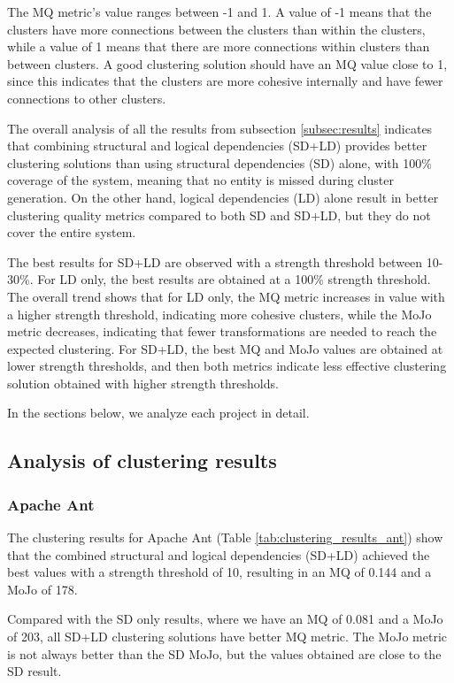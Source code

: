 \documentclass{ieeeaccess}
\begin{document}
The MQ metric's value ranges between -1 and 1. A value of -1 means that the clusters have more connections between the clusters than within the clusters, while a value of 1 means that there are more connections within clusters than between clusters. A good clustering solution should have an MQ value close to 1, since this indicates that the clusters are more cohesive internally and have fewer connections to other clusters.

The overall analysis of all the results from subsection \ref{subsec:results} indicates that combining structural and logical dependencies (SD+LD) provides better clustering solutions than using structural dependencies (SD) alone, with 100\% coverage of the system, meaning that no entity is missed during cluster generation. On the other hand, logical dependencies (LD) alone result in better clustering quality metrics compared to both SD and SD+LD, but they do not cover the entire system.

The best results for SD+LD are observed with a strength threshold between 10-30\%. For LD only, the best results are obtained at a 100\% strength threshold. The overall trend shows that for LD only, the MQ metric increases in value with a higher strength threshold, indicating more cohesive clusters, while the MoJo metric decreases, indicating that fewer transformations are needed to reach the expected clustering. For SD+LD, the best MQ and MoJo values are obtained at lower strength thresholds, and then both metrics indicate less effective clustering solution obtained with higher strength thresholds.

In the sections below, we analyze each project in detail.

\subsection{Analysis of clustering results}

\subsubsection{Apache Ant}

The clustering results for Apache Ant (Table \ref{tab:clustering_results_ant}) show that the combined structural and logical dependencies (SD+LD) achieved the best values with a strength threshold of 10, resulting in an MQ of 0.144 and a MoJo of 178.

Compared with the SD only results, where we have an MQ of 0.081 and a MoJo of 203, all SD+LD clustering solutions have better MQ metric. The MoJo metric is not always better than the SD MoJo, but the values obtained are close to the SD result.
\end{document}
